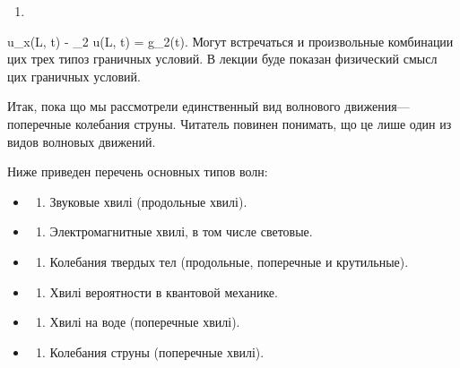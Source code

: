 \documentclass[
  ukrainian,
]{article}
\providecommand{\tightlist}{%
  \setlength{\itemsep}{0pt}\setlength{\parskip}{0pt}}
\begin{document}
\begin{enumerate}
\def\labelenumi{\arabic{enumi}.}
\setcounter{enumi}{13}
\tightlist
\item
\end{enumerate}

u\_x(L, t) - \gamma\_2 u(L, t) = g\_2(t). Могут встречаться и
произвольные комбинации цих трех типоз граничных условий. В лекции буде
показан физический смысл цих граничных условий.

Итак, пока що мы рассмотрели единственный вид волнового
движения---поперечные колебания струны. Читатель повинен понимать, що це
лише один из видов волновых движений.

Ниже приведен перечень основных типов волн:

\begin{itemize}
\tightlist
\item
  \begin{enumerate}
  \def\labelenumi{\arabic{enumi}.}
  \tightlist
  \item
    Звуковые хвилі (продольные хвилі).
  \end{enumerate}
\item
  \begin{enumerate}
  \def\labelenumi{\arabic{enumi}.}
  \setcounter{enumi}{1}
  \tightlist
  \item
    Электромагнитные хвилі, в том числе световые.
  \end{enumerate}
\item
  \begin{enumerate}
  \def\labelenumi{\arabic{enumi}.}
  \setcounter{enumi}{2}
  \tightlist
  \item
    Колебания твердых тел (продольные, поперечные и крутильные).
  \end{enumerate}
\item
  \begin{enumerate}
  \def\labelenumi{\arabic{enumi}.}
  \setcounter{enumi}{3}
  \tightlist
  \item
    Хвилі вероятности в квантовой механике.
  \end{enumerate}
\item
  \begin{enumerate}
  \def\labelenumi{\arabic{enumi}.}
  \setcounter{enumi}{4}
  \tightlist
  \item
    Хвилі на воде (поперечные хвилі).
  \end{enumerate}
\item
  \begin{enumerate}
  \def\labelenumi{\arabic{enumi}.}
  \setcounter{enumi}{5}
  \tightlist
  \item
    Колебания струны (поперечные хвилі).
  \end{enumerate}
\end{itemize}
\end{document}

